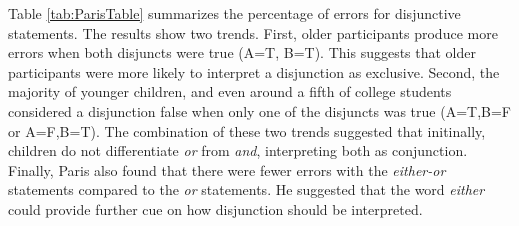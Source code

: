 \documentclass[oneside]{report}
\theoremstyle{definition}
\theoremstyle{definition}
\theoremstyle{definition}
\theoremstyle{remark}
\begin{document}
Table \ref{tab:ParisTable} summarizes the percentage of errors for
disjunctive statements. The results show two trends. First, older
participants produce more errors when both disjuncts were true (A=T,
B=T). This suggests that older participants were more likely to
interpret a disjunction as exclusive. Second, the majority of younger
children, and even around a fifth of college students considered a
disjunction false when only one of the disjuncts was true (A=T,B=F or
A=F,B=T). The combination of these two trends suggested that initinally,
children do not differentiate \emph{or} from \emph{and}, interpreting
both as conjunction. Finally, Paris also found that there were fewer
errors with the \emph{either-or} statements compared to the \emph{or}
statements. He suggested that the word \emph{either} could provide
further cue on how disjunction should be interpreted.
\end{document}
